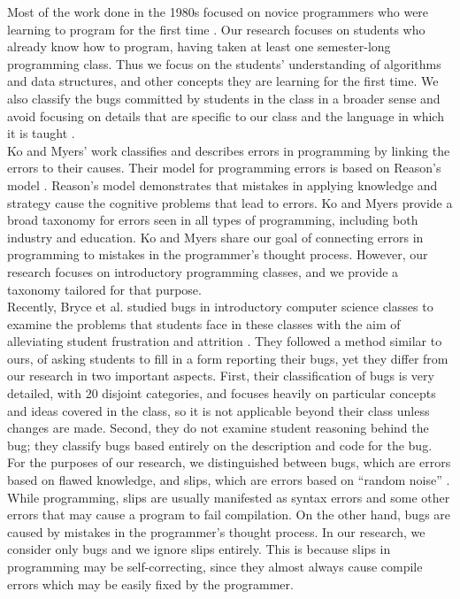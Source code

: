 \documentclass{sig-alternate}
\begin{document}
Most of the work done in the 1980s focused on novice programmers who
were learning to program for the first time
\cite{Pea86,SpohrerSoloway86}. Our research focuses on students who
already know how to program, having taken at least one semester-long
programming class. Thus we focus on the students' understanding of
algorithms and data structures, and other concepts they are learning
for the first time. We also classify the bugs committed by students in
the class in a broader sense and avoid focusing on details that are
specific to our class and the language in which it is taught
\cite{Arnold10}.\\

Ko and Myers' work \cite{KoMyers03} classifies and describes errors in
programming by linking the errors to their causes. Their model for
programming errors is based on Reason's model \cite{Reason90}.
Reason's model demonstrates that mistakes in applying knowledge and
strategy cause the cognitive problems that lead to errors. Ko and
Myers provide a broad taxonomy for errors seen in all types of
programming, including both industry and education. Ko and Myers share
our goal of connecting errors in programming to mistakes in the
programmer's thought process. However, our research focuses on
introductory programming classes, and we provide a taxonomy tailored
for that purpose.\\

Recently, Bryce et al. studied bugs in introductory computer science
classes to examine the problems that students face in these classes
with the aim of alleviating student frustration and attrition
\cite{BryceCooleyHansenHayrapetyan10}. They followed a method similar
to ours, of asking students to fill in a form reporting their bugs,
yet they differ from our research in two important aspects. First,
their classification of bugs is very detailed, with 20 disjoint
categories, and focuses heavily on particular concepts and ideas
covered in the class, so it is not applicable beyond their class
unless changes are made.  Second, they do not examine student
reasoning behind the bug; they classify bugs based entirely on the
description and code for the bug.\\

For the purposes of our research, we distinguished between bugs, which
are errors based on flawed knowledge, and slips, which are errors
based on ``random noise'' \cite{VanLehn90}. While programming, slips
are usually manifested as syntax errors and some other errors that may
cause a program to fail compilation. On the other hand, bugs are
caused by mistakes in the programmer's thought process. In our
research, we consider only bugs and we ignore slips entirely. This is
because slips in programming may be self-correcting, since they almost
always cause compile errors which may be easily fixed by the
programmer.\\
\end{document}
